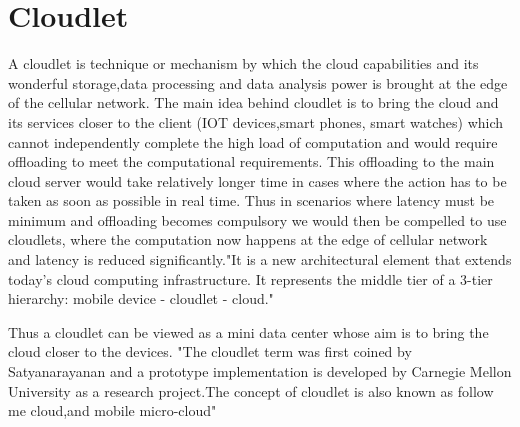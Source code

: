 \section{Cloudlet}


A cloudlet is technique or mechanism by which the cloud capabilities
and its wonderful storage,data processing and data analysis power is 
brought at the edge of the cellular network.
The main idea behind cloudlet is to bring the cloud and its services closer
to the client (IOT devices,smart phones, smart watches) which cannot 
independently complete the high load of computation and would require offloading
to meet the computational requirements. This offloading to the main cloud server
would take relatively longer time in cases where the action has to be taken as soon
as possible in real time. Thus in scenarios where latency must be minimum and 
offloading becomes compulsory we would then be compelled to use cloudlets, where the 
computation now happens at the edge of cellular network and latency is reduced 
significantly."It is a new architectural element that extends today’s cloud 
computing infrastructure. It represents the middle tier of a 3-tier hierarchy: 
mobile device - cloudlet - cloud." \cite{wikiCloudlet}

Thus a cloudlet can be viewed as a mini data center whose aim is to 
bring the cloud closer to the devices. "The cloudlet term was first coined by Satyanarayanan 
and a prototype implementation is developed by Carnegie Mellon University as a 
research project.The concept of cloudlet is also known as follow me cloud,and 
mobile micro-cloud" \cite{wikiCloudlet}
